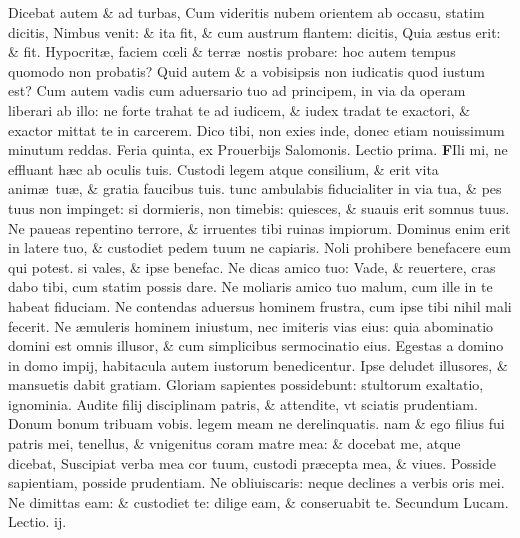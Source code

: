 \documentclass[a5paper,10pt]{book}
\def\leftmarginnote{%
	\lrmarginnote{\hskip -\marginparsep \hskip -6.5em}}
\def\rightmarginnote{%
	\lrmarginnote{\hskip\columnwidth \hskip -1em}}
\def\ae{æ}
\def\oe{œ}
\begin{document}
\begin{multicols*}{2}
Dicebat autem \& ad turbas, Cum videritis nubem orientem ab occasu, statim dicitis, Nimbus venit: \& ita fit, \& cum austrum flantem: dicitis, Quia \ae stus erit: \& fit.
Hypocrit\ae , faciem c\oe li \& terr\ae \ nostis probare: hoc autem tempus quomodo non probatis?
Quid autem \& a vobisipsis non iudicatis quod iustum est?
Cum autem vadis cum aduersario tuo ad principem, in via da operam liberari ab illo: ne forte trahat te ad iudicem, \& iudex tradat te exactori, \& exactor mittat te in carcerem.
Dico tibi, non exies inde, donec etiam nouissimum minutum reddas.
\newline {} \color{red} \hypertarget{THU-PRIMA-POST-ADV}{Feria quinta,} ex Prouerbijs Salomonis. \hfill Lectio prima. \color{black}
\vspace{-2.25em}
\lettrine[lines=2]{\bfseries F}{}Ili\rightmarginnote{ca. 3.} mi, ne effluant h\ae c ab oculis tuis.
Custodi legem atque consilium, \& erit vita anim\ae \ tu\ae , \& gratia faucibus tuis.
tunc ambulabis fiducialiter in via tua, \& pes tuus non impinget: si dormieris, non timebis: quiesces, \& suauis erit somnus tuus.
Ne paueas repentino terrore, \& irruentes tibi ruinas impiorum.
Dominus enim erit in latere tuo, \& custodiet pedem tuum ne capiaris.
Noli prohibere benefacere eum qui potest. si vales, \& ipse benefac.
Ne dicas amico tuo: Vade, \& reuertere, cras dabo tibi, cum statim possis dare.
Ne moliaris amico tuo malum, cum ille in te habeat fiduciam.
Ne contendas aduersus hominem frustra, cum ipse tibi nihil mali fecerit.
Ne \ae muleris hominem iniustum, nec imiteris vias eius: quia abominatio domini est omnis illusor, \& cum simplicibus sermocinatio eius.
Egestas a domino in domo impij, habitacula autem iustorum benedicentur.
Ipse deludet illusores, \& mansuetis dabit gratiam. Gloriam sapientes possidebunt: stultorum exaltatio, ignominia.
Audite\leftmarginnote{\begin{flushright}ca. 4.\end{flushright}} filij disciplinam patris, \& attendite, vt sciatis prudentiam.
Donum bonum tribuam vobis. legem meam ne derelinquatis. nam \& ego filius fui patris mei, tenellus, \& vnigenitus coram matre mea: \& docebat me, atque dicebat, Suscipiat verba mea cor tuum, custodi pr\ae cepta mea, \& viues.
Posside sapientiam, posside prudentiam. Ne obliuiscaris: neque declines a verbis oris mei.
Ne dimittas eam: \& custodiet te: dilige eam, \& conseruabit te.
\fancyhead[C]{\color{red} Feria. v. Dominic\ae . j. post aduentum}
\newline \color{red} Secundum Lucam. \hfill Lectio. ij. \color{black}

\end{multicols*}
\end{document}
